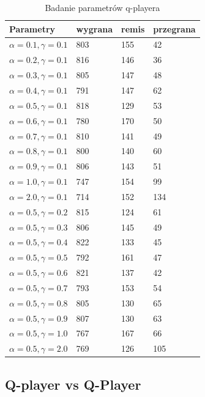 \documentclass{article}
\begin{document}
\begin{table}
  \centering
  \caption{Badanie parametrów q-playera}
  \begin{tabular}{|l|l|l|l|}
    \hline
    Parametry & wygrana & remis & przegrana \\ \hline
    $\alpha = 0.1, \gamma = 0.1$ & 803 & 155 & 42 \\ \hline
    $\alpha = 0.2, \gamma = 0.1$ & 816 & 146 & 36 \\ \hline
    $\alpha = 0.3, \gamma = 0.1$ & 805 & 147 & 48 \\ \hline
    $\alpha = 0.4, \gamma = 0.1$ & 791 & 147 & 62 \\ \hline
    $\alpha = 0.5, \gamma = 0.1$ & 818 & 129 & 53 \\ \hline
    $\alpha = 0.6, \gamma = 0.1$ & 780 & 170 & 50 \\ \hline
    $\alpha = 0.7, \gamma = 0.1$ & 810 & 141 & 49 \\ \hline
    $\alpha = 0.8, \gamma = 0.1$ & 800 & 140 & 60 \\ \hline
    $\alpha = 0.9, \gamma = 0.1$ & 806 & 143 & 51 \\ \hline
    $\alpha = 1.0, \gamma = 0.1$ & 747 & 154 & 99 \\ \hline
    $\alpha = 2.0, \gamma = 0.1$ & 714 & 152 & 134 \\ \hline\hline
    $\alpha = 0.5, \gamma = 0.2$ & 815 & 124 & 61 \\ \hline
    $\alpha = 0.5, \gamma = 0.3$ & 806 & 145 & 49 \\ \hline
    $\alpha = 0.5, \gamma = 0.4$ & 822 & 133 & 45 \\ \hline
    $\alpha = 0.5, \gamma = 0.5$ & 792 & 161 & 47 \\ \hline
    $\alpha = 0.5, \gamma = 0.6$ & 821 & 137 & 42 \\ \hline
    $\alpha = 0.5, \gamma = 0.7$ & 793 & 153 & 54 \\ \hline
    $\alpha = 0.5, \gamma = 0.8$ & 805 & 130 & 65 \\ \hline
    $\alpha = 0.5, \gamma = 0.9$ & 807 & 130 & 63 \\ \hline
    $\alpha = 0.5, \gamma = 1.0$ & 767 & 167 & 66 \\ \hline
    $\alpha = 0.5, \gamma = 2.0$ & 769 & 126 & 105 \\ \hline
  \end{tabular}
\end{table}

\subsection{Q-player vs Q-Player}
\end{document}
